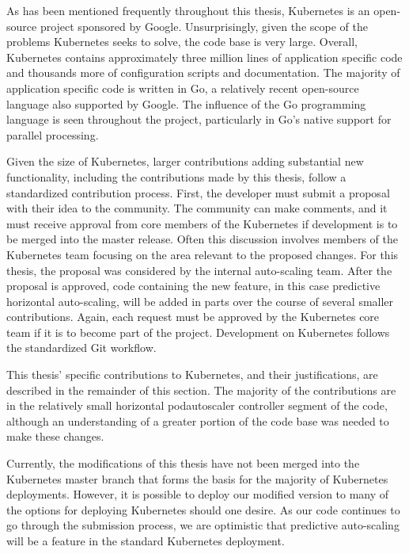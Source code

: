 As has been mentioned frequently throughout this thesis, Kubernetes is an
open-source project sponsored by Google. Unsurprisingly, given the scope of the
problems Kubernetes seeks to solve, the code base is very large. Overall,
Kubernetes contains approximately three million lines of application specific
code and thousands more of configuration scripts and documentation. The majority
of application specific code is written in Go, a relatively recent open-source
language also supported by Google. The influence of the Go programming language
is seen throughout the project, particularly in Go's native support for parallel
processing.

Given the size of Kubernetes, larger contributions adding substantial new functionality,
including the contributions made by this thesis, follow a standardized contribution process.
First, the developer must submit a proposal with their idea to the community.
The community can make comments, and it must receive approval from core members
of the Kubernetes if development is to be merged into the master release. Often
this discussion involves members of the Kubernetes team focusing on the area
relevant to the proposed changes. For this thesis, the proposal was considered
by the internal auto-scaling team. After the proposal is approved, code
containing the new feature, in this case predictive horizontal auto-scaling,
will be added in parts over the course of several smaller contributions. Again,
each request must be approved by the Kubernetes core team if it is to become
part of the project. Development on Kubernetes follows the standardized Git workflow.

This thesis' specific contributions to Kubernetes, and their justifications,
are described in the remainder of this section. The majority of the
contributions are in the relatively small horizontal podautoscaler controller
segment of the code, although an understanding of a greater portion of the code
base was needed to make these changes.

Currently, the modifications of this thesis have not been merged into the
Kubernetes master branch that forms the basis for the majority of Kubernetes
deployments. However, it is possible to deploy our modified version to many of
the options for deploying Kubernetes should one desire. As our code continues to
go through the submission process, we are optimistic that predictive
auto-scaling will be a feature in the standard Kubernetes deployment.
